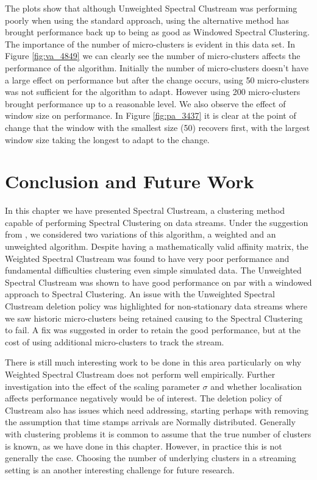 The plots show that although Unweighted Spectral Clustream was performing poorly when using the standard approach, using the alternative method has brought performance back up to being as good as Windowed Spectral Clustering.  The importance of the number of micro-clusters is evident in this data set.  In Figure \ref{fig:va_4849} we can clearly see the number of micro-clusters affects the performance of the algorithm. Initially the number of micro-clusters doesn't have a large effect on performance but after the change occurs, using 50 micro-clusters was not sufficient for the algorithm to adapt. However using 200 micro-clusters brought performance up to a reasonable level.  We also observe the effect of window size on performance. In Figure \ref{fig:pa_3437} it is clear at the point of change that the window with the smallest size (50) recovers first, with the largest window size taking the longest to adapt to the change. 

\section{Conclusion and Future Work}
\label{sec:clustream_conc}

In this chapter we have presented Spectral Clustream, a clustering method capable of performing Spectral Clustering on data streams. Under the suggestion from \cite{Zhang1996a}, we considered two variations of this algorithm, a weighted and an unweighted algorithm. Despite having a mathematically valid affinity matrix, the Weighted Spectral Clustream was found to have very poor performance and fundamental difficulties clustering even simple simulated data. The Unweighted Spectral Clustream was shown to have good performance on par with a windowed approach to Spectral Clustering. An issue with the Unweighted Spectral Clustream deletion policy was highlighted for non-stationary data streams where we saw historic micro-clusters being retained causing to the Spectral Clustering to fail. A fix was suggested in order to retain the good performance, but at the cost of using additional micro-clusters to track the stream.

There is still much interesting work to be done in this area particularly on why Weighted Spectral Clustream does not perform well empirically. Further investigation into the effect of the scaling parameter $\sigma$ and whether localisation affects performance negatively would be of interest. The deletion policy of Clustream also has issues which need addressing, starting perhaps with removing the assumption that time stamps arrivals are Normally distributed. Generally with clustering problems it is common to assume that the true number of clusters is known, as we have done in this chapter. However, in practice this is not generally the case. Choosing the number of underlying clusters in a streaming setting is an another interesting challenge for future research.

